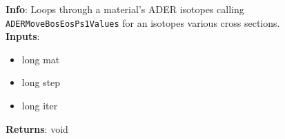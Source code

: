 \textbf{Info}: Loops through a material's ADER isotopes calling
\texttt{ADERMoveBosEosPs1Values} for an isotopes various cross sections.\\

\noindent \textbf{Inputs}:
\begin{itemize}
\item{long mat}
\item{long step}
\item{long iter}
\end{itemize}

\noindent \textbf{Returns}: void

